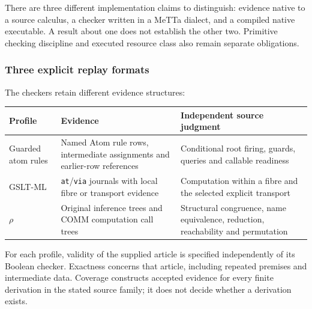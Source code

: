 \documentclass[11pt]{article}
\newcommand{\code}[1]{\nolinkurl{#1}}
\begin{document}
There are three different implementation claims to distinguish: evidence native
to a source calculus, a checker written in a MeTTa dialect, and a compiled native
executable. A result about one does not establish the other two. Primitive
checking discipline and executed resource class also remain separate obligations.

\subsubsection{Three explicit replay formats}
The checkers retain different evidence structures:
\begin{center}
\begin{tabular}{>{\raggedright\arraybackslash}p{.14\linewidth}>{\raggedright\arraybackslash}p{.38\linewidth}>{\raggedright\arraybackslash}p{.38\linewidth}}
\toprule
Profile & Evidence & Independent source judgment \\
\midrule
Guarded atom rules & Named Atom rule rows, intermediate assignments and earlier-row references & Conditional root firing, guards, queries and callable readiness \\
GSLT-ML & \code{at}/\code{via} journals with local fibre or transport evidence & Computation within a fibre and the selected explicit transport \\
$\rho$ & Original inference trees and COMM computation call trees & Structural congruence, name equivalence, reduction, reachability and permutation \\
\bottomrule
\end{tabular}
\end{center}
For each profile, validity of the supplied article is specified independently
of its Boolean checker. Exactness concerns that article, including repeated
premises and intermediate data. Coverage constructs accepted evidence for
every finite derivation in the stated source family; it does not decide
whether a derivation exists.
\end{document}
